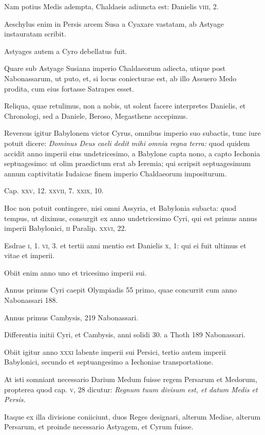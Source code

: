 \begin{parnumbers}
Nam
potius Medis adempta, Chaldaeis adiuncta est: Danielis \textsc{viii}, 2.

Aeschylus enim in Persis arcem Susa a Cyaxare vastatam, ab Astyage
instauratam scribit.

Astyages autem a Cyro debellatus fuit.

Quare sub Astyage Susiana imperio Chaldaeorum adiecta, utique
post Nabonassarum, ut puto, et, si locus coniecturae est, ab illo
Assuero Medo prodita, cum eius fortasse Satrapes esset.

Reliqua,
quae retulimus, non a nobis, ut solent facere interpretes Danielis,
et Chronologi, sed a Daniele, Beroso, Megasthene accepimus.

Reversus igitur Babylonem victor Cyrus, omnibus imperio suo
subactis, tunc iure potuit dicere: \textit{Dominus Deus caeli dedit mihi omnia
regna terra:} quod quidem accidit anno imperii eius undetricesimo,
a Babylone capta nono, a capto Iechonia septuagesimo: ut
olim praedictum erat ab Ieremia; qui scripsit septuagesimum annum
captivitatis Iudaicae finem imperio Chaldaeorum impositurum.

Cap. \textsc{xxv}, 12. \textsc{xxvii}, 7. \textsc{xxix}, 10.

Hoc non potuit contingere,
nisi omni Assyria, et Babylonia subacta: quod tempus,
ut diximus, consurgit ex anno undetricesimo Cyri, qui est primus
annus imperii Babylonici, \textsc{ii} Paralip. \textsc{xxvi}, 22.

Esdrae \textsc{i}, 1.
\textsc{vi}, 3. et tertii anni mentio est Danielis \textsc{x}, 1: qui ei fuit
 ultimus et
 vitae et imperii.

Obiit enim anno uno et tricesimo imperii sui.

Annus primus Cyri caepit Olympiadis 55 primo, quae concurrit cum
anno Nabonassari 188.

Annus primus Cambysis, 219 Nabonassari.

Differentia initii Cyri, et Cambysis, anni solidi 30. a Thoth
189 Nabonassari.

Obiit igitur anno \textsc{xxxi} labente imperii sui Persici,
tertio autem imperii Babylonici, secundo et septuangesimo a
Iechoniae transportatione.

At isti somniant necessario Darium Medum
fuisse regem Persarum et Medorum, propterea quod cap. \textsc{v},
28 dicutur: \textit{Regnum tuum divisum est, et datum Medis et Persis.}

Itaque ex illa divisione coniiciunt, duos Reges designari, alterum
Mediae, alterum Persarum, et proinde necessario Astyagem, et
Cyrum fuisse.


\end{parnumbers}
